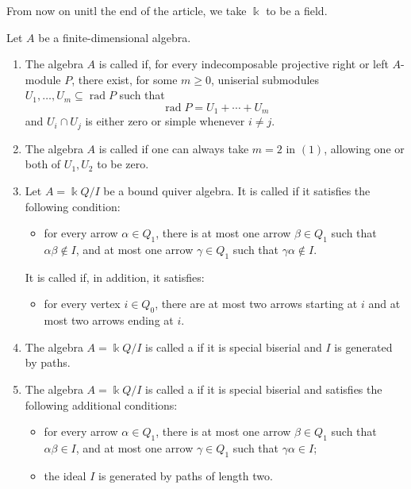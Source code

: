 \documentclass[a4paper,leqno]{amsart}
\begin{document}
From now on unitl the end of the article, we take $\Bbbk$ to be a field.

\begin{dfn}
Let $A$ be a finite-dimensional algebra.
\begin{enumerate}
\item The algebra $A$ is called  if, for every indecomposable projective right or left $A$-module $P$, there exist, for some $m\geq0$, uniserial submodules $U_1,\ldots,U_m\subseteq\operatorname{rad}P$ such that
$$
\operatorname{rad}P=U_1+\cdots+U_m
$$
and $U_i\cap U_j$ is either zero or simple whenever $i\neq j$.

\item The algebra $A$ is called  if one can always take
$m=2$ in $(1)$, allowing one or both of $U_1,U_2$ to be zero.

\item Let $A=\Bbbk Q/I$ be a bound quiver algebra. It is called  if it satisfies the following condition:
\begin{itemize}
\item[(SM)] for every arrow $\alpha\in Q_1$, there is at most one arrow $\beta\in Q_1$ such that $\alpha\beta\notin I$, and at most one arrow $\gamma\in Q_1$ such that $\gamma\alpha\notin I$.
\end{itemize}
It is called  if, in addition, it satisfies:
\begin{itemize}
\item[(SB)] for every vertex $i\in Q_0$, there are at most two arrows starting at $i$ and at most two arrows ending at $i$.
\end{itemize}

\item The algebra $A=\Bbbk Q/I$ is called a  if it is special biserial and $I$ is generated by paths.

\item The algebra $A=\Bbbk Q/I$ is called a  if it is special biserial and satisfies the following additional conditions:
\begin{itemize}
\item[(G1)] for every arrow $\alpha\in Q_1$, there is at most one arrow $\beta\in Q_1$ such that $\alpha\beta\in I$, and at most one arrow $\gamma\in Q_1$ such that $\gamma\alpha\in I$;
\item[(G2)] the ideal $I$ is generated by paths of length two.
\end{itemize}
\end{enumerate}
\end{dfn}
\end{document}
